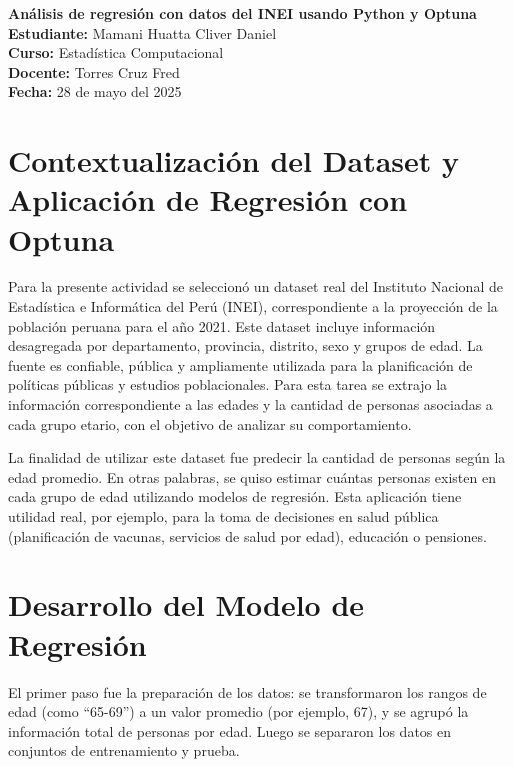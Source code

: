 \documentclass[a4paper,10pt]{article}
\begin{document}
\thispagestyle{fancy}

\begin{center}
    \textbf{\LARGE Análisis de regresión con datos del INEI usando Python y Optuna} \\
    \vspace{0.3cm}
    \textbf{Estudiante:} Mamani Huatta Cliver Daniel \\
    \textbf{Curso:} Estadística Computacional \\
    \textbf{Docente:} Torres Cruz Fred \\
    \textbf{Fecha:} 28 de mayo del 2025
\end{center}

\vspace{0.5cm}

\section*{Contextualización del Dataset y Aplicación de Regresión con Optuna}

Para la presente actividad se seleccionó un dataset real del Instituto Nacional de Estadística e Informática del Perú (INEI), correspondiente a la proyección de la población peruana para el año 2021. Este dataset incluye información desagregada por departamento, provincia, distrito, sexo y grupos de edad. La fuente es confiable, pública y ampliamente utilizada para la planificación de políticas públicas y estudios poblacionales. Para esta tarea se extrajo la información correspondiente a las edades y la cantidad de personas asociadas a cada grupo etario, con el objetivo de analizar su comportamiento.

La finalidad de utilizar este dataset fue predecir la cantidad de personas según la edad promedio. En otras palabras, se quiso estimar cuántas personas existen en cada grupo de edad utilizando modelos de regresión. Esta aplicación tiene utilidad real, por ejemplo, para la toma de decisiones en salud pública (planificación de vacunas, servicios de salud por edad), educación o pensiones.

\section*{Desarrollo del Modelo de Regresión}

El primer paso fue la preparación de los datos: se transformaron los rangos de edad (como ``65-69'') a un valor promedio (por ejemplo, 67), y se agrupó la información total de personas por edad. Luego se separaron los datos en conjuntos de entrenamiento y prueba.
\end{document}

